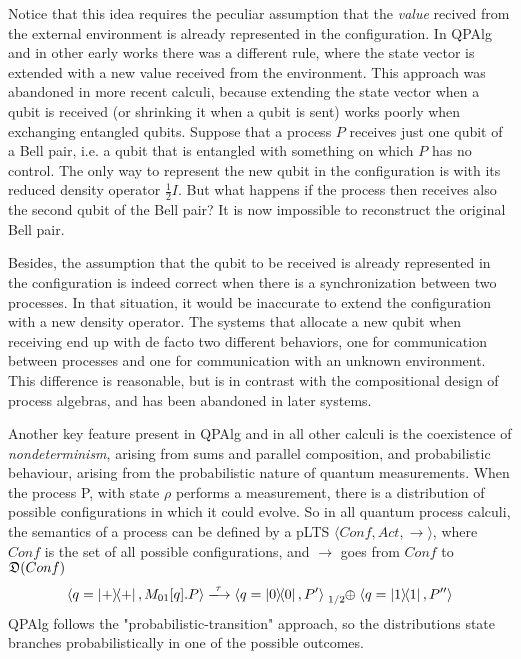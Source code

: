 Notice that this idea requires the peculiar assumption that the \textit{value} recived from the external environment is already represented in the configuration. In QPAlg and in other early works \cite{fengProbabilisticBisimulationsQuantum2007} there was a different rule, where the state vector is extended with a new value received from the environment. This approach was abandoned in more recent calculi, because extending the state vector when a qubit is received (or shrinking it when a qubit is sent) works poorly when exchanging entangled qubits. 
Suppose that a process $P$ receives just one qubit of a Bell pair, i.e. a qubit that is entangled with something on which $P$ has no control. The only way to represent the new qubit in the configuration is with its reduced density operator $\frac{1}{2}I$. But what happens if the process then receives also the second qubit of the Bell pair? It is now impossible to reconstruct the original Bell pair.

Besides, the assumption that the qubit to be received is already represented in the configuration is indeed correct when there is a synchronization between two processes. In that situation, it would be inaccurate to extend the configuration with a new density operator. The systems that allocate a new qubit when receiving end up with de facto two different behaviors, one for communication between processes and one for communication with an unknown environment. This difference is reasonable, but is in contrast with the compositional design of process algebras, and has been abandoned in later systems.


Another key feature present in QPAlg and in all other calculi is the coexistence of \textit{nondeterminism}, arising from sums and parallel composition, and probabilistic behaviour, arising from the probabilistic nature of quantum measurements. When the process P, with state $\rho$ performs a measurement, there is a distribution of possible configurations in which it could evolve. So in all quantum process calculi, the semantics of a process can be defined by a pLTS $\langle Conf, Act, \rightarrow \rangle$, where $Conf$ is the set of all possible configurations, and $\rightarrow$ goes from $Conf$ to $\mathfrak{D}(Conf)$
\[
	\confw{q = \proj{+}, M_{01}[q].P} 
	\xlongrightarrow{\tau} 
	\confw{q = \proj{0}, P'} \psum{1/2} \confw{q = \proj{1}, P''}
\]
QPAlg follows the "probabilistic-transition" approach, so the distributions state branches probabilistically in one of the possible outcomes.



